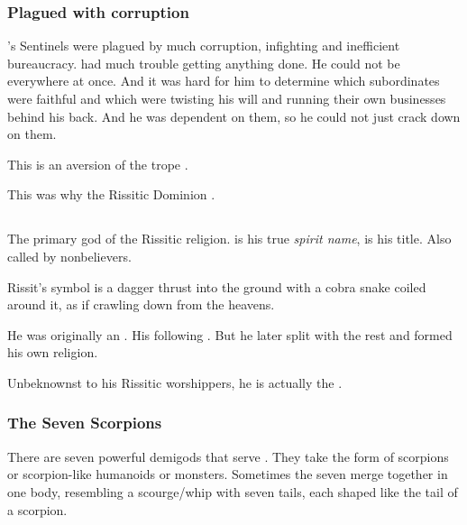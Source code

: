 \subsubsection{Plagued with corruption}
\Secherdamon's Sentinels were plagued by much corruption, infighting and inefficient bureaucracy. 
\Secherdamon had much trouble getting anything done. 
He could not be everywhere at once. 
And it was hard for him to determine which subordinates were faithful and which were twisting his will and running their own businesses behind his back. 
And he was dependent on them, so he could not just crack down on them. 

This is an aversion of the trope .

This was why the Rissitic Dominion .









\subsection{\HriistN} 
\index{\HriistN}
The primary god of the Rissitic religion. 
\quo{\Hriist} is his true \emph{spirit name}, \quo{\Nechsain} is his title. 
Also called  by nonbelievers. 

Rissit's symbol is a dagger thrust into the ground with a cobra snake coiled around it, as if crawling down from the heavens. 

He was originally an . 
His following . 
But he later split with the rest and formed his own religion. 

Unbeknownst to his Rissitic worshippers, he is actually the \dragon{} . 



\subsubsection{The Seven Scorpions}
There are seven powerful \daemonic{} demigods that serve \Nechsain. They take the form of scorpions or scorpion-like humanoids or monsters. Sometimes the seven merge together in one body, resembling a scourge/whip with seven tails, each shaped like the tail of a scorpion. 

